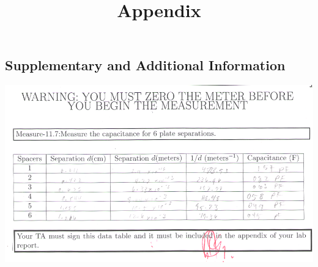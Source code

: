 \documentclass{article}
\title{\textbf{Appendix}}    \author{}   \date{}
\begin{document}
\maketitle
\begin{center}
    \section*{Supplementary and Additional Information}
\end{center}
\vfill
\begin{center}
    \includegraphics[scale=3.5]{Images/datacheck.png}
\end{center}
\vfill
\end{document}
